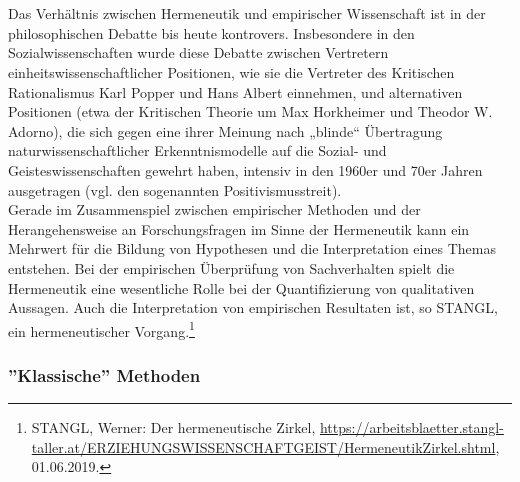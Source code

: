 \documentclass[12pt,a4paper]{article}
\begin{document}
\\
\\
Das Verhältnis zwischen Hermeneutik und empirischer Wissenschaft ist in der philosophischen Debatte bis heute kontrovers. Insbesondere in den Sozialwissenschaften wurde diese Debatte zwischen Vertretern einheitswissenschaftlicher Positionen, wie sie die Vertreter des Kritischen Rationalismus Karl Popper und Hans Albert einnehmen, und alternativen Positionen (etwa der Kritischen Theorie um Max Horkheimer und Theodor W. Adorno), die sich gegen eine ihrer Meinung nach „blinde“ Übertragung naturwissenschaftlicher Erkenntnismodelle auf die Sozial- und Geisteswissenschaften gewehrt haben, intensiv in den 1960er und 70er Jahren ausgetragen (vgl. den sogenannten Positivismusstreit). 
\\
Gerade im Zusammenspiel zwischen empirischer Methoden und der Herangehensweise an Forschungsfragen im Sinne der Hermeneutik kann ein Mehrwert für die Bildung von Hypothesen und die Interpretation eines Themas entstehen. Bei der empirischen Überprüfung von Sachverhalten spielt die Hermeneutik eine wesentliche Rolle bei der Quantifizierung von qualitativen Aussagen. Auch die Interpretation von empirischen Resultaten ist, so STANGL, ein hermeneutischer Vorgang.\footnote{STANGL, Werner: Der hermeneutische Zirkel, \protect\url{https://arbeitsblaetter.stangl-taller.at/ERZIEHUNGSWISSENSCHAFTGEIST/HermeneutikZirkel.shtml}, 01.06.2019.}

\subsubsection{''Klassische'' Methoden}
\label{Methoden}
\end{document}
